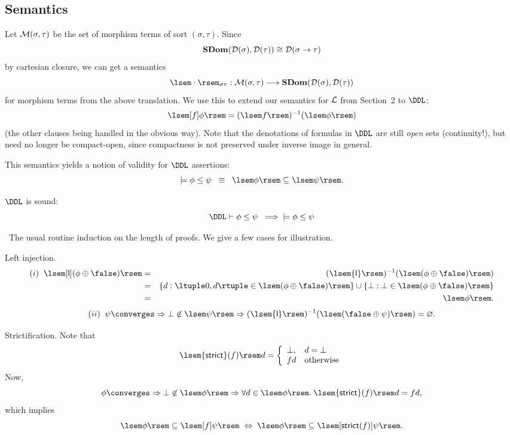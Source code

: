 \subsection*{Semantics}
Let ${\cal M}(\sigma , \tau )$ be the set of morphism terms of sort $(\sigma , \tau )$.
Since 
\[ {\bf SDom}({\cal D}(\sigma ), {\cal D}(\tau )) \cong {\cal D}(\sigma \rightarrow \tau ) \]
by cartesian closure, we can get a semantics
\[ \lsem \cdot \rsem_{\sigma \tau} : {\cal M}(\sigma , \tau ) \longrightarrow {\bf SDom}({\cal D}(\sigma ), {\cal D}(\tau )) \]
for morphism terms from the above translation.
We use this to extend our semantics for $\cal L$ from Section~2 to $\DDL$:
\[ \lsem [f]\phi \rsem = (\lsem f \rsem )^{-1} (\lsem \phi \rsem ) \]
(the other clauses being handled in the obvious way).
Note that the denotations of formulas in $\DDL$ are still {\em open} sets (continuity!),
but need no longer be compact-open, since compactness is not preserved under inverse image in general.

This semantics yields a notion of validity for $\DDL$ assertions:
\[ \models \phi \leq \psi \;\; \equiv \;\; \lsem \phi \rsem \subseteq \lsem \psi \rsem . \]
\begin{theorem} $\DDL$ is sound:
\[ \DDL \vdash \phi \leq \psi \;\; \Longrightarrow \;\; \models \phi \leq \psi \]
\end{theorem}

\proof\ The usual routine induction on the length of proofs.
We give a few cases for illustration.

Left injection.
\begin{eqnarray*}
(i) \;\; \lsem [{\sf l}]( \phi  \oplus \false ) \rsem & = & ( \lsem {\sf l} \rsem )^{-1}(\lsem ( \phi \oplus \false ) \rsem ) \\
& = & \{ d : \ltuple 0, d \rtuple \in \lsem (\phi \oplus \false ) \rsem \} \cup \{ \bot : \bot \in \lsem ( \phi \oplus \false ) \rsem \} \\
& = & \lsem \phi \rsem .
\end{eqnarray*}
\[ (ii) \;\; \psi \converges \Rightarrow \bot \not\in \lsem \psi \rsem \Rightarrow
(\lsem {\sf l} \rsem )^{-1} (\lsem ( \false \oplus \psi ) \rsem ) 
= \varnothing . \] 

Strictification. Note that
\[ \lsem {\sf strict}(f) \rsem d = \left\{ \begin{array}{ll}
\bot , & d = \bot \\
f d  & \mbox{otherwise}
\end{array}
\right. \]
Now,
\[ \phi \converges \Rightarrow \bot \not\in \lsem \phi \rsem \Rightarrow
\forall d \in \lsem \phi \rsem. \: \lsem {\sf strict}(f) \rsem d = fd, \]
which implies
\[ \lsem \phi \rsem \subseteq \lsem [f]\psi \rsem \; \Leftrightarrow \; \lsem
\phi \rsem \subseteq \lsem [{\sf strict}(f)]\psi \rsem . \]

